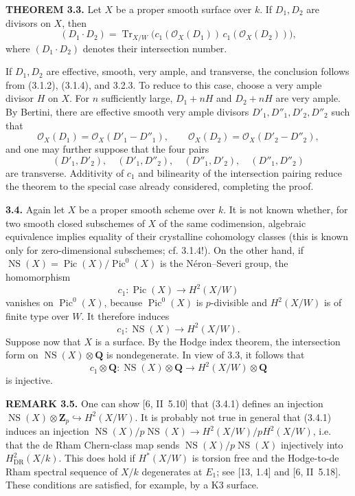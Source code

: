 \documentclass[10pt]{article}
\begin{document}
\noindent\textbf{THEOREM 3.3.} Let $X$ be a proper smooth surface over $k$. If $D_1,D_2$ are divisors on $X$, then
\[
(D_1\cdot D_2)=\operatorname{Tr}_{X/W}\bigl(c_1(\mathcal O_X(D_1))\,c_1(\mathcal O_X(D_2))\bigr),
\]
where $(D_1\cdot D_2)$ denotes their intersection number.

If $D_1,D_2$ are effective, smooth, very ample, and transverse, the conclusion follows from (3.1.2), (3.1.4), and 3.2.3. To reduce to this case, choose a very ample divisor $H$ on $X$. For $n$ sufficiently large, $D_1+nH$ and $D_2+nH$ are very ample. By Bertini, there are effective smooth very ample divisors $D'_1,D''_1,D'_2,D''_2$ such that
\[
\mathcal O_X(D_1)=\mathcal O_X(D'_1-D''_1),\qquad
\mathcal O_X(D_2)=\mathcal O_X(D'_2-D''_2),
\]
and one may further suppose that the four pairs
\[
(D'_1,D'_2),\quad(D'_1,D''_2),\quad(D''_1,D'_2),\quad(D''_1,D''_2)
\]
are transverse. Additivity of $c_1$ and bilinearity of the intersection pairing reduce the theorem to the special case already considered, completing the proof.
\newpage
\setcounter{footnote}{0}
\fontsize{10.2pt}{12.04pt}\selectfont

\noindent\textbf{3.4.} Again let $X$ be a proper smooth scheme over $k$. It is not known whether, for two smooth closed subschemes of $X$ of the same codimension, algebraic equivalence implies equality of their crystalline cohomology classes (this is known only for zero-dimensional subschemes; cf. 3.1.4!). On the other hand, if
$\operatorname{NS}(X)=\operatorname{Pic}(X)/\operatorname{Pic}^0(X)$ is the Néron--Severi group, the homomorphism
\[
c_1:\operatorname{Pic}(X)\longrightarrow H^2(X/W)
\]
vanishes on $\operatorname{Pic}^0(X)$, because $\operatorname{Pic}^0(X)$ is $p$-divisible and $H^2(X/W)$ is of finite type over $W$. It therefore induces
\begin{equation}\tag{3.4.1}
c_1:\operatorname{NS}(X)\longrightarrow H^2(X/W).
\end{equation}
Suppose now that $X$ is a surface. By the Hodge index theorem, the intersection form on $\operatorname{NS}(X)\otimes\mathbf Q$ is nondegenerate. In view of 3.3, it follows that
\begin{equation}\tag{3.4.2}
c_1\otimes\mathbf Q:\operatorname{NS}(X)\otimes\mathbf Q
\longrightarrow H^2(X/W)\otimes\mathbf Q
\end{equation}
is injective.

\noindent\textbf{REMARK 3.5.} One can show [6, II~5.10] that (3.4.1) defines an injection
$\operatorname{NS}(X)\otimes\mathbf Z_p\hookrightarrow H^2(X/W)$. It is probably not true in general that (3.4.1) induces an injection
$\operatorname{NS}(X)/p\operatorname{NS}(X)\to H^2(X/W)/pH^2(X/W)$, i.e. that the de Rham Chern-class map sends $\operatorname{NS}(X)/p\operatorname{NS}(X)$ injectively into $H^2_{\mathrm{DR}}(X/k)$. This does hold if $H^*(X/W)$ is torsion free and the Hodge-to-de Rham spectral sequence of $X/k$ degenerates at $E_1$; see [13, 1.4] and [6, II~5.18]. These conditions are satisfied, for example, by a K3 surface.
\end{document}
